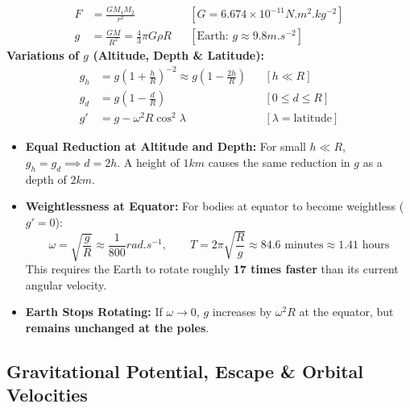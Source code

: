\documentclass[10pt,twoside,openright]{book}
\begin{document}
\begin{formulabox}
\begin{align}
  F &= \frac{G M_1 M_2}{r^2} && [G = 6.674\times 10^{-11}\si{N.m^2.kg^{-2}}] \\
  g &= \frac{GM}{R^2} = \frac{4}{3}\pi G \rho R && [\text{Earth: } g \approx 9.8\si{m.s^{-2}}]
\end{align}
\textbf{Variations of $g$ (Altitude, Depth \& Latitude):}
\begin{align}
  g_h &= g\left(1 + \frac{h}{R}\right)^{-2} \approx g\left(1 - \frac{2h}{R}\right) && [h \ll R] \\
  g_d &= g\left(1 - \frac{d}{R}\right) && [0 \le d \le R] \\
  g' &= g - \omega^2 R \cos^2\lambda && [\lambda = \text{latitude}]
\end{align}
\end{formulabox}

\begin{usecasebox}
\begin{itemize}
  \item \textbf{Equal Reduction at Altitude and Depth:} For small $h \ll R$, $g_h = g_d \implies d = 2h$. A height of $1\si{km}$ causes the same reduction in $g$ as a depth of $2\si{km}$.
  \item \textbf{Weightlessness at Equator:} For bodies at equator to become weightless ($g'=0$):
  \begin{equation*}
    \omega = \sqrt{\frac{g}{R}} \approx \frac{1}{800}\si{rad.s^{-1}}, \qquad T = 2\pi\sqrt{\frac{R}{g}} \approx 84.6\text{ minutes} \approx 1.41\text{ hours}
  \end{equation*}
  This requires the Earth to rotate roughly \textbf{17 times faster} than its current angular velocity.
  \item \textbf{Earth Stops Rotating:} If $\omega \to 0$, $g$ increases by $\omega^2 R$ at the equator, but \textbf{remains unchanged at the poles}.
\end{itemize}
\end{usecasebox}

\subsection{Gravitational Potential, Escape \& Orbital Velocities}
\end{document}

